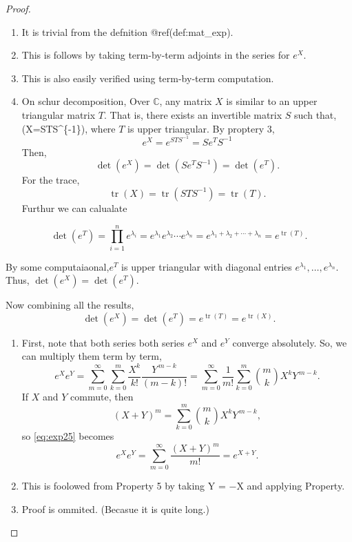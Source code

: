 \documentclass[
]{book}
\providecommand{\tightlist}{%
  \setlength{\itemsep}{0pt}\setlength{\parskip}{0pt}}
\theoremstyle{definition}
\theoremstyle{definition}
\theoremstyle{definition}
\theoremstyle{definition}
\theoremstyle{remark}
\begin{document}
\begin{proof}
\leavevmode

\begin{enumerate}
\def\labelenumi{\arabic{enumi}.}
\tightlist
\item
  It is trivial from the defnition @ref(def:mat\_exp).
\item
  This is follows by taking term-by-term adjoints in the series for \(e^X\).
\item
  This is also easily verified using term-by-term computation.
\item
  On schur decomposition, Over \(\mathbb{C}\), any matrix \(X\) is similar to an upper triangular matrix \(T\). That is, there exists an invertible matrix \(S\) such that, (X=STS\^{}\{-1\}), where \(T\) is upper triangular. By proptery 3,
  \[
  e^X = e^{STS^{-1}}= Se^TS^{-1}
  \]
  Then,\[\det(e^X)=\det(Se^TS^{-1})=\det(e^T).\]
  For the trace,
  \[\operatorname{tr}(X)=\operatorname{tr}(STS^{-1})=\operatorname{tr}(T).\]
  Furthur we can calualate
\end{enumerate}

\[
\det(e^{T}) = \prod_{i=1}^{n} e^{\lambda_i}
= e^{\lambda_1} e^{\lambda_2} \cdots e^{\lambda_n}
= e^{\lambda_1 + \lambda_2 + \cdots + \lambda_n}
= e^{\operatorname{tr}(T)}.
\]

By some computaiaonal,\(e^{T}\) is upper triangular with diagonal entries \(e^{\lambda_1}, \dots, e^{\lambda_n}\). Thus, \(\det(e^X)=\det(e^T)\).

Now combining all the results,
\[
\det(e^{X}) = \det(e^{T}) = e^{\operatorname{tr}(T)} = e^{\operatorname{tr}(X)}.
\]

\begin{enumerate}
\def\labelenumi{\arabic{enumi}.}
\setcounter{enumi}{4}
\tightlist
\item
  First, note that both series both series \(e^X\) and \(e^Y\) converge absolutely. So, we can multiply them term by term,
  \begin{equation}
  e^X e^Y = \sum_{m=0}^{\infty} \sum_{k=0}^{m} \frac{X^k}{k!} \frac{Y^{\,m-k}}{(m-k)!}
  = \sum_{m=0}^{\infty} \frac{1}{m!} \sum_{k=0}^{m} \binom{m}{k} X^k Y^{\,m-k}. \label{eq:exp25}
  \end{equation}
  If \(X\) and \(Y\) commute, then
  \[(X+Y)^m = \sum_{k=0}^{m} \binom{m}{k} X^k Y^{\,m-k},\]
  so \eqref{eq:exp25} becomes
  \[e^X e^Y = \sum_{m=0}^{\infty} \frac{(X+Y)^m}{m!} = e^{X+Y}.\]
\item
  This is foolowed from Property 5 by taking Y = −X and applying Property.
\item
  Proof is ommited. (Becasue it is quite long.)
\end{enumerate}

\end{proof}
\end{document}
